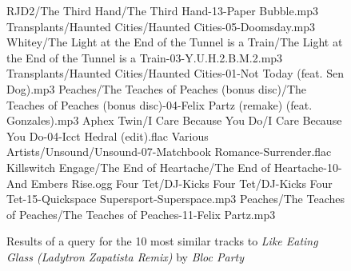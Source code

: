 \begin{figure}[p]
	\caption{Results of a query for the 10 most similar tracks to \emph{Like Eating Glass (Ladytron Zapatista Remix)} by \emph{Bloc Party}}
	\label{fig:testing:user:similarity:c}
	\begin{listing}{1}
RJD2/The Third Hand/The Third Hand-13-Paper Bubble.mp3
Transplants/Haunted Cities/Haunted Cities-05-Doomsday.mp3
Whitey/The Light at the End of the Tunnel is a Train/The Light at the End of the Tunnel is a Train-03-Y.U.H.2.B.M.2.mp3
Transplants/Haunted Cities/Haunted Cities-01-Not Today (feat. Sen Dog).mp3
Peaches/The Teaches of Peaches (bonus disc)/The Teaches of Peaches (bonus disc)-04-Felix Partz (remake) (feat. Gonzales).mp3
Aphex Twin/I Care Because You Do/I Care Because You Do-04-Icct Hedral (edit).flac
Various Artists/Unsound/Unsound-07-Matchbook Romance-Surrender.flac
Killswitch Engage/The End of Heartache/The End of Heartache-10-And Embers Rise.ogg
Four Tet/DJ-Kicks Four Tet/DJ-Kicks Four Tet-15-Quickspace Supersport-Superspace.mp3
Peaches/The Teaches of Peaches/The Teaches of Peaches-11-Felix Partz.mp3
\end{listing}
\end{figure}
